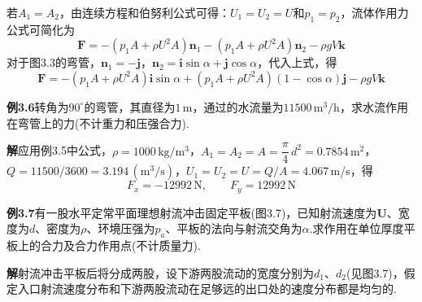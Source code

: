 若$A_1=A_2$，由连续方程和伯努利公式可得：$U_1=U_2=U$和$p_1=p_2$，流体作用力公式可简化为
\[
\boldsymbol{F}=-(p_1A+\rho U^{2}A)\boldsymbol{n}_1-(p_1A+\rho U^{2}A)\boldsymbol{n}_2-\rho gV\boldsymbol{k}
\]
对于图3.3的弯管，$\boldsymbol{n}_1=-\boldsymbol{j}$，$\boldsymbol{n}_2=\boldsymbol{i}\sin\alpha+\boldsymbol{j}\cos\alpha$，代入上式，得
\[
\boldsymbol{F}=-(p_1A+\rho U^{2}A)\boldsymbol{i}\sin\alpha+(p_1A+\rho U^{2}A)(1-\cos\alpha)\boldsymbol{j}-\rho gV\boldsymbol{k}
\]

\noindent\textbf{例3.6}\quad 转角为$90^{\circ}$的弯管，其直径为$1\,$m，通过的水流量为$11500\,\mathrm{m^3/h}$，求水流作用在弯管上的力(不计重力和压强合力).

\noindent\textbf{解}\quad 应用例3.5中公式，$\rho=1000\,\mathrm{kg/m^3}$，$A_1=A_2=A=\dfrac{\pi}{4}\,d^{2}=0.7854\,\mathrm{m^2}$，
$Q=11500/3600=3.194\,(\mathrm{m^3/s})$，$U_1=U_2=U=Q/A=4.067\,$m/s，得
\[
F_x=-12992\,\mathrm{N},\qquad F_y=12992\,\mathrm{N}
\]

\noindent\textbf{例3.7}\quad 有一股水平定常平面理想射流冲击固定平板(图3.7)，已知射流速度为$\boldsymbol{U}$、宽度为$d$、密度为$\rho$、环境压强为$p_a$、平板的法向与射流交角为$\alpha$.求作用在单位厚度平板上的合力及合力作用点(不计质量力).

\noindent\textbf{解}\quad 射流冲击平板后将分成两股，设下游两股流动的宽度分别为$d_1$、$d_2$(见图3.7)，假定入口射流速度分布和下游两股流动在足够远的出口处的速度分布都是均匀的.

